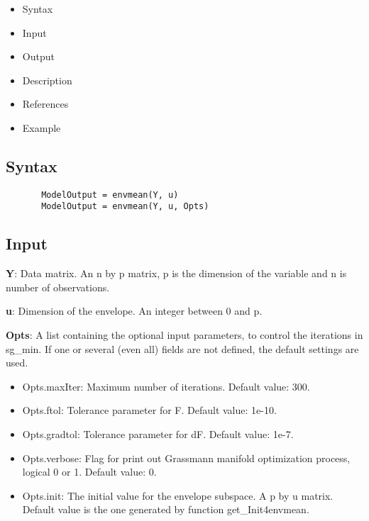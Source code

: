 \documentclass[a4paper,11pt,openany]{memoir}
\begin{document}
\begin{itemize}
\setlength{\itemsep}{-1ex}
   \item Syntax
   \item Input
   \item Output
   \item Description
   \item References
   \item Example
\end{itemize}


\subsection*{Syntax}


\begin{verbatim}       ModelOutput = envmean(Y, u)
       ModelOutput = envmean(Y, u, Opts)\end{verbatim}
    

\subsection*{Input}

\begin{par}
\textbf{Y}: Data matrix. An n by p matrix, p is the dimension of the variable and n is number of observations.
\end{par} \vspace{1em}
\begin{par}
\textbf{u}: Dimension of the envelope. An integer between 0 and p.
\end{par} \vspace{1em}
\begin{par}
\textbf{Opts}: A list containing the optional input parameters, to control the iterations in sg\_min. If one or several (even all) fields are not defined, the default settings are used.
\end{par} \vspace{1em}
\begin{itemize}
\setlength{\itemsep}{-1ex}
   \item Opts.maxIter: Maximum number of iterations.  Default value: 300.
   \item Opts.ftol: Tolerance parameter for F.  Default value: 1e-10.
   \item Opts.gradtol: Tolerance parameter for dF.  Default value: 1e-7.
   \item Opts.verbose: Flag for print out Grassmann manifold optimization process, logical 0 or 1. Default value: 0.
   \item Opts.init: The initial value for the envelope subspace. A p by u matrix. Default value is the one generated by function get\_Init4envmean.
\end{itemize}
\end{document}
